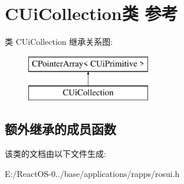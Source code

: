 \hypertarget{class_c_ui_collection}{}\section{C\+Ui\+Collection类 参考}
\label{class_c_ui_collection}
类 C\+Ui\+Collection 继承关系图\+:\begin{figure}[H]
\begin{center}
\leavevmode
\includegraphics[height=2.000000cm]{class_c_ui_collection}
\end{center}
\end{figure}
\subsection*{额外继承的成员函数}


该类的文档由以下文件生成\+:\begin{DoxyCompactItemize}
\item 
E\+:/\+React\+O\+S-\/0../base/applications/rapps/rosui.\+h\end{DoxyCompactItemize}
